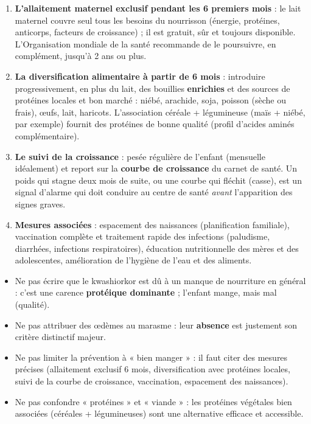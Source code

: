 \documentclass[11pt]{article}
\newcommand{\cle}[1]{{\popxbold\color{popdark}#1}}
\begin{document}
\begin{enumerate}
\item \textbf{L'allaitement maternel exclusif pendant les 6 premiers mois} : le lait maternel couvre seul tous les besoins du nourrisson (énergie, protéines, anticorps, facteurs de croissance) ; il est gratuit, sûr et toujours disponible. L'Organisation mondiale de la santé recommande de le poursuivre, en complément, jusqu'à 2 ans ou plus.
\item \textbf{La diversification alimentaire à partir de 6 mois} : introduire progressivement, en plus du lait, des bouillies \textbf{enrichies} et des sources de protéines locales et bon marché : \cle{niébé}, \cle{arachide}, \cle{soja}, \cle{poisson} (sèche ou frais), œufs, lait, haricots. L'association céréale + légumineuse (maïs + niébé, par exemple) fournit des protéines de bonne qualité (profil d'acides aminés complémentaire).
\item \textbf{Le suivi de la croissance} : pesée régulière de l'enfant (mensuelle idéalement) et report sur la \textbf{courbe de croissance} du carnet de santé. Un poids qui stagne deux mois de suite, ou une courbe qui fléchit (casse), est un signal d'alarme qui doit conduire au centre de santé \emph{avant} l'apparition des signes graves.
\item \textbf{Mesures associées} : espacement des naissances (planification familiale), vaccination complète et traitement rapide des infections (paludisme, diarrhées, infections respiratoires), éducation nutritionnelle des mères et des adolescentes, amélioration de l'hygiène de l'eau et des aliments.
\end{enumerate}

\begin{attention}
\begin{itemize}
\item Ne pas écrire que le kwashiorkor est dû à un manque de nourriture en général : c'est une carence \textbf{protéique dominante} ; l'enfant mange, mais mal (qualité).
\item Ne pas attribuer des œdèmes au marasme : leur \textbf{absence} est justement son critère distinctif majeur.
\item Ne pas limiter la prévention à « bien manger » : il faut citer des mesures précises (allaitement exclusif 6 mois, diversification avec protéines locales, suivi de la courbe de croissance, vaccination, espacement des naissances).
\item Ne pas confondre « protéines » et « viande » : les protéines végétales bien associées (céréales + légumineuses) sont une alternative efficace et accessible.
\end{itemize}
\end{attention}
\end{document}
